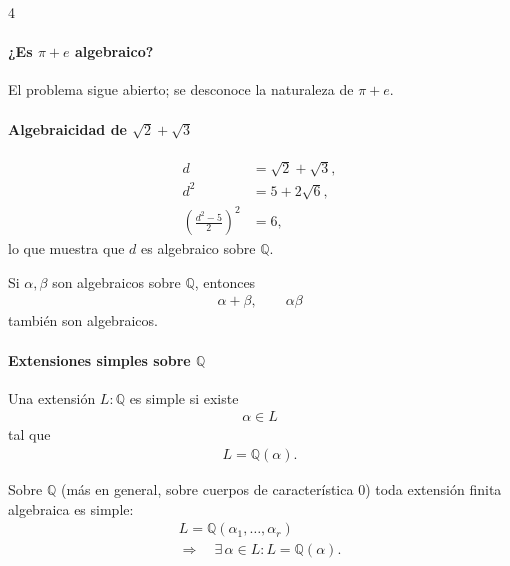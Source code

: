 \documentclass[landscape,a4paper]{article}
\begin{document}
\begin{multicols}{4}
\paragraph{¿Es $\pi+e$ algebraico?}
El problema sigue abierto; se desconoce la naturaleza de $\pi+e$.
\paragraph{Algebraicidad de $\sqrt{2}+\sqrt{3}$}
\begin{align*}
d &= \sqrt{2} + \sqrt{3},\\
d^{2} &= 5 + 2\sqrt{6},\\
\left(\frac{d^{2}-5}{2}\right)^{2} &= 6,
\end{align*}
lo que muestra que $d$ es algebraico sobre $\mathbb{Q}$.

\begin{tcolorbox}[colback=white,colframe=red!80!black,colbacktitle=red!80!black,
                  coltitle=white,title={Teorema: Cierre bajo suma y producto}]
Si $\alpha,\beta$ son algebraicos sobre $\mathbb{Q}$, entonces
\begin{align*}
\alpha+\beta,\qquad \alpha\beta
\end{align*}
también son algebraicos.
\end{tcolorbox}

\paragraph{Extensiones simples sobre $\mathbb{Q}$}
\begin{tcolorbox}[colback=white,colframe=blue!80!black,colbacktitle=blue!80!black,
                  coltitle=white,title={Extensión simple}]
Una extensión $L:\mathbb{Q}$ es simple si existe \begin{align*}\alpha\in L\end{align*} tal que
\begin{align*}
L = \mathbb{Q}(\alpha).
\end{align*}
\end{tcolorbox}

\begin{tcolorbox}[colback=white,colframe=red!80!black,colbacktitle=red!80!black,
                  coltitle=white,title={Teorema del elemento primitivo}]
Sobre $\mathbb{Q}$ (más en general, sobre cuerpos de característica $0$) toda extensión finita algebraica es simple:
\begin{align*}
   L = \mathbb{Q}(\alpha_1,\dots,\alpha_r) \quad \\\Longrightarrow \quad
   \exists\,\alpha\in L : L=\mathbb{Q}(\alpha).
\end{align*}
\end{tcolorbox}


\end{multicols}
\end{document}
